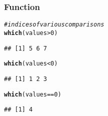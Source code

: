\documentclass[12pt]{beamer}\usepackage[]{graphicx}\usepackage[]{color}
\makeatletter
\newcommand{\hlnum}[1]{\textcolor[rgb]{0.686,0.059,0.569}{#1}}%
\newcommand{\hlcom}[1]{\textcolor[rgb]{0.678,0.584,0.686}{\textit{#1}}}%
\newcommand{\hlopt}[1]{\textcolor[rgb]{0,0,0}{#1}}%
\newcommand{\hlstd}[1]{\textcolor[rgb]{0.345,0.345,0.345}{#1}}%
\newcommand{\hlkwd}[1]{\textcolor[rgb]{0.737,0.353,0.396}{\textbf{#1}}}%
\newenvironment{kframe}{%
 \def\at@end@of@kframe{}%
 \ifinner\ifhmode%
  \def\at@end@of@kframe{\end{minipage}}%
  \begin{minipage}{\columnwidth}%
 \fi\fi%
 \def\FrameCommand##1{\hskip\@totalleftmargin \hskip-\fboxsep
 \colorbox{shadecolor}{##1}\hskip-\fboxsep
     \hskip-\linewidth \hskip-\@totalleftmargin \hskip\columnwidth}%
 \MakeFramed {\advance\hsize-\width
   \@totalleftmargin\z@ \linewidth\hsize
   \@setminipage}}%
 {\par\unskip\endMakeFramed%
 \at@end@of@kframe}
\newenvironment{knitrout}{}{} %
\makeatother
\begin{document}
\begin{frame}[fragile]
\frametitle{Function }

\begin{knitrout}\footnotesize
{}\color{fgcolor}\begin{kframe}
\begin{alltt}
\hlcom{# indices of various comparisons}
\hlkwd{which}\hlstd{(values} \hlopt{>} \hlnum{0}\hlstd{)}
\end{alltt}
\begin{verbatim}
## [1] 5 6 7
\end{verbatim}
\begin{alltt}
\hlkwd{which}\hlstd{(values} \hlopt{<} \hlnum{0}\hlstd{)}
\end{alltt}
\begin{verbatim}
## [1] 1 2 3
\end{verbatim}
\begin{alltt}
\hlkwd{which}\hlstd{(values} \hlopt{==} \hlnum{0}\hlstd{)}
\end{alltt}
\begin{verbatim}
## [1] 4
\end{verbatim}
\end{kframe}
\end{knitrout}

\end{frame}

\end{document}
